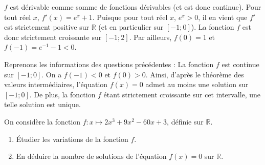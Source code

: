 \documentclass[11pt,fleqn, openany]{book} %
\begin{document}
\begin{solution}
 $f$ est dérivable comme somme de fonctions dérivables (et est donc continue). Pour tout réel $x$, $f'(x)=e^x+1$. Puisque pour tout réel $x$, $e^x>0$, il en vient que $f'$ est strictement positive sur $\mathbb{R}$ (et en particulier sur $[-1;0]$). La fonction $f$ est donc strictement croissante sur $[-1;2]$. Par ailleurs, $f(0)=1$ et $f(-1)=e^{-1}-1<0$.
 
Reprenons les informations des questions précédentes :
La fonction $f$ est continue sur $[-1;0]$. On a $f(-1)<0$ et $f(0)>0$. Ainsi, d'après le théorème des valeurs intermédiaires, l'équation $f(x)=0$ admet au moins une solution sur $[-1;0]$. De plus, la fonction $f$ étant strictement croissante sur cet intervalle, une telle solution est unique.\end{solution}




\begin{exercise}[topic=cont03] On considère la fonction $f:x \mapsto 2x^3+9x^2-60x+3$, définie sur $\mathbb{R}$.
\begin{enumerate}
\item Étudier les variations de la fonction $f$.
\item En déduire la nombre de solutions de l'équation $f(x)=0$ sur $\mathbb{R}$.
\end{enumerate}\end{exercise}
\end{document}
